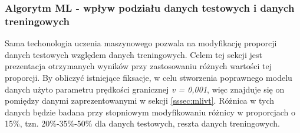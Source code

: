\subsubsection{Algorytm ML - wpływ podziału danych testowych i danych treningowych}
\label{sssec:mldivide}
Sama techonologia uczenia maszynowego pozwala na modyfikację proporcji danych testowych względem danych treningowych. Celem tej sekcji jest prezentacja otrzymanych wyników przy zastosowaniu różnych wartości tej proporcji. By obliczyć istniejące fiksacje, w celu stworzenia poprawnego modelu danych użyto parametru prędkości granicznej \emph{v = 0,001}, więc znajduje się on pomiędzy danymi zaprezentowanymi w sekcji \ref{sssec:mlivt}. Różnica w tych danych będzie badana przy stopniowym modyfikowaniu różnicy w proporcjach o 15\%, tzn. 20\%-35\%-50\% dla danych testowych, reszta danych treningowych.
